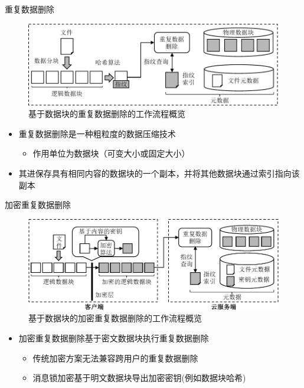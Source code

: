 \documentclass{beamer}
\begin{document}
\begin{frame}{重复数据删除}
    \begin{figure}[!htb]
        \small
        \centering
        \includegraphics[width=\linewidth]{../pic/background/chunk-based-dedup-arch.pdf}
        \caption{基于数据块的重复数据删除的工作流程概览}
        \label{fig:chunk-based-dedup-flow}
    \end{figure}
    \vspace{-1em}
    \begin{itemize}
        \item 重复数据删除是一种粗粒度的数据压缩技术
              \begin{itemize}
                  \item 作用单位为数据块（可变大小或固定大小）
              \end{itemize}
        \item  其进保存具有相同内容的数据块的一个副本，并将其他数据块通过索引指向该副本
    \end{itemize}
\end{frame}

\begin{frame}{加密重复数据删除}
    \begin{figure}[!htb]
        \small
        \centering
        \includegraphics[width=\textwidth]{../pic/background/chunk-based-enc-dedup-arch.pdf}
        \caption{基于数据块的加密重复数据删除的工作流程概览}
        \label{fig:chunk-based-enc-dedup-flow}
    \end{figure}
    \vspace{-1em}
    \begin{itemize}
        \item 加密重复数据删除基于密文数据块执行重复数据删除
              \begin{itemize}
                  \item 传统加密方案无法兼容跨用户的重复数据删除
                  \item 消息锁加密基于明文数据块导出加密密钥(例如数据块哈希)
              \end{itemize}
    \end{itemize}
\end{frame}
\end{document}
